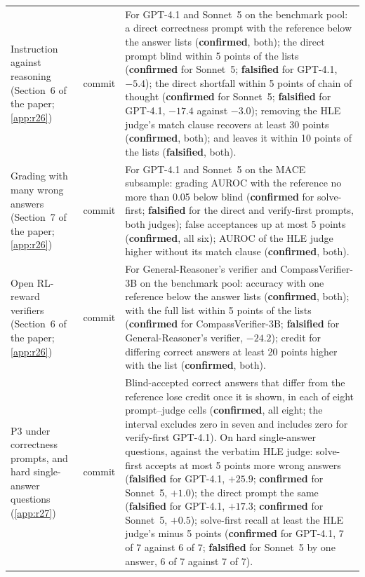 {\begin{longtable}{L{3.2cm}L{1.1cm}L{8.7cm}}
Instruction against reasoning (Section~6 of the paper; \cref{app:r26}) & commit & For GPT-4.1 and Sonnet~5 on the benchmark pool: a direct correctness prompt with the reference below the answer lists (\textbf{confirmed}, both); the direct prompt blind within 5 points of the lists (\textbf{confirmed} for Sonnet~5; \textbf{falsified} for GPT-4.1, $-5.4$); the direct shortfall within 5 points of chain of thought (\textbf{confirmed} for Sonnet~5; \textbf{falsified} for GPT-4.1, $-17.4$ against $-3.0$); removing the HLE judge's match clause recovers at least 30 points (\textbf{confirmed}, both); and leaves it within 10 points of the lists (\textbf{falsified}, both). \\
Grading with many wrong answers (Section~7 of the paper; \cref{app:r26}) & commit & For GPT-4.1 and Sonnet~5 on the \textsc{MACE} subsample: grading AUROC with the reference no more than 0.05 below blind (\textbf{confirmed} for solve-first; \textbf{falsified} for the direct and verify-first prompts, both judges); false acceptances up at most 5 points (\textbf{confirmed}, all six); AUROC of the HLE judge higher without its match clause (\textbf{confirmed}, both). \\
Open RL-reward verifiers (Section~6 of the paper; \cref{app:r26}) & commit & For General-Reasoner's verifier and CompassVerifier-3B on the benchmark pool: accuracy with one reference below the answer lists (\textbf{confirmed}, both); with the full list within 5 points of the lists (\textbf{confirmed} for CompassVerifier-3B; \textbf{falsified} for General-Reasoner's verifier, $-24.2$); credit for differing correct answers at least 20 points higher with the list (\textbf{confirmed}, both). \\
P3 under correctness prompts, and hard single-answer questions (\cref{app:r27}) & commit & Blind-accepted correct answers that differ from the reference lose credit once it is shown, in each of eight prompt--judge cells (\textbf{confirmed}, all eight; the interval excludes zero in seven and includes zero for verify-first GPT-4.1). On hard single-answer questions, against the verbatim HLE judge: solve-first accepts at most 5 points more wrong answers (\textbf{falsified} for GPT-4.1, $+25.9$; \textbf{confirmed} for Sonnet~5, $+1.0$); the direct prompt the same (\textbf{falsified} for GPT-4.1, $+17.3$; \textbf{confirmed} for Sonnet~5, $+0.5$); solve-first recall at least the HLE judge's minus 5 points (\textbf{confirmed} for GPT-4.1, 7 of 7 against 6 of 7; \textbf{falsified} for Sonnet~5 by one answer, 6 of 7 against 7 of 7). \\

\end{longtable}}
